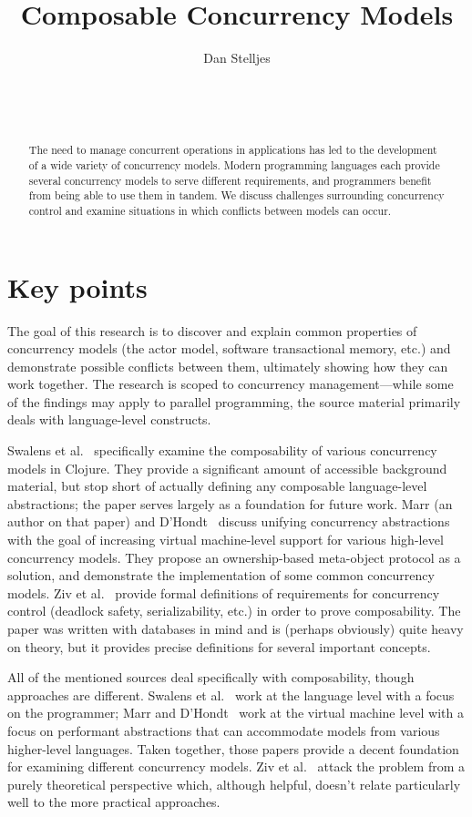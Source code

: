 \documentclass{sig-alternate}
\author{
\alignauthor{}
Dan Stelljes\\
  \affaddr{Division of Science and Mathematics}\\
  \affaddr{University of Minnesota, Morris}\\
  \affaddr{Morris, Minnesota, USA 56267}\\
  \email{stell124@morris.umn.edu}
}
\title{Composable Concurrency Models}
\begin{document}
\maketitle

\begin{abstract}

The need to manage concurrent operations in applications has led to the development of a wide variety of concurrency models. Modern programming languages each provide several concurrency models to serve different requirements, and programmers benefit from being able to use them in tandem. We discuss challenges surrounding concurrency control and examine situations in which conflicts between models can occur.

\end{abstract}

\section*{Key points}

The goal of this research is to discover and explain common properties of concurrency models (the actor model, software transactional memory, etc.) and demonstrate possible conflicts between them, ultimately showing how they can work together. The research is scoped to concurrency management---while some of the findings may apply to parallel programming, the source material primarily deals with language-level constructs.

Swalens et al.~\cite{Swalens2014} specifically examine the composability of various concurrency models in Clojure. They provide a significant amount of accessible background material, but stop short of actually defining any composable language-level abstractions; the paper serves largely as a foundation for future work. Marr (an author on that paper) and D'Hondt~\cite{Marr2012} discuss unifying concurrency abstractions with the goal of increasing virtual machine-level support for various high-level concurrency models. They propose an ownership-based meta-object protocol as a solution, and demonstrate the implementation of some common concurrency models. Ziv et al.~\cite{Ziv2015} provide formal definitions of requirements for concurrency control (deadlock safety, serializability, etc.) in order to prove composability. The paper was written with databases in mind and is (perhaps obviously) quite heavy on theory, but it provides precise definitions for several important concepts.

All of the mentioned sources deal specifically with composability, though approaches are different. Swalens et al.~\cite{Swalens2014} work at the language level with a focus on the programmer; Marr and D'Hondt~\cite{Marr2012} work at the virtual machine level with a focus on performant abstractions that can accommodate models from various higher-level languages. Taken together, those papers provide a decent foundation for examining different concurrency models. Ziv et al.~\cite{Ziv2015} attack the problem from a purely theoretical perspective which, although helpful, doesn't relate particularly well to the more practical approaches.
\end{document}
